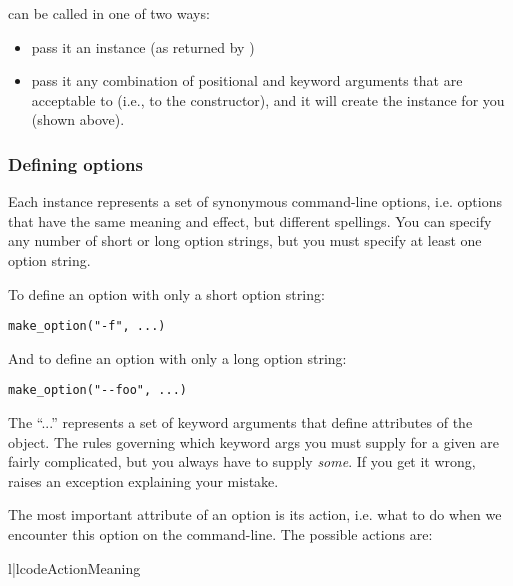  can be called in one of two ways:

\begin{itemize}
\item pass it an  instance  (as returned by )
\item pass it any combination of positional and keyword arguments that
are acceptable to  (i.e., to the 
constructor), and it will create the  instance for you
(shown above).
\end{itemize}

\subsubsection{Defining options\label{optparse-defining-options}}

Each  instance represents a set of synonymous
command-line options, i.e. options that have the same meaning and
effect, but different spellings.  You can specify any number of short
or long option strings, but you must specify at least one option
string.

To define an option with only a short option string:

\begin{verbatim}
make_option("-f", ...)
\end{verbatim}

And to define an option with only a long option string:

\begin{verbatim}
make_option("--foo", ...)
\end{verbatim}

The ``...'' represents a set of keyword arguments that define attributes
of the  object.  The rules governing which keyword args
you must supply for a given  are fairly complicated, but
you always have to supply \emph{some}.  If you get it wrong,
 raises an  exception explaining
your mistake.

The most important attribute of an option is its action, i.e. what to do
when we encounter this option on the command-line.  The possible actions
are:

\begin{tableii}{l|l}{code}{Action}{Meaning}
\end{tableii}

